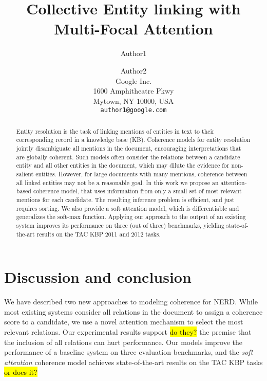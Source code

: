 \documentclass[11pt]{article}
\title{Collective Entity linking with Multi-Focal Attention}
\author{Author1 \and Author2\\
	    Google Inc. \\
	    1600 Amphitheatre Pkwy\\
	    Mytown, NY 10000, USA\\
	    {\tt author1@google.com}}
\date{}
\begin{document}
\maketitle

\begin{abstract}
Entity resolution is the task of linking mentions of entities in text to their corresponding record in a knowledge base (KB). Coherence models for entity resolution jointly disambiguate all mentions in the document,  encouraging interpretations that are globally coherent. Such models often consider the relations between a candidate entity and all other entities in the document, which may dilute the evidence for non-salient entities. However, for large documents with many mentions, coherence between all linked entities may not be a reasonable goal. In this work we propose an attention-based coherence model, that uses information from only a small set of most relevant mentions for each candidate. The resulting inference problem is efficient, and just requires sorting. We also provide a soft attention model, which is differentiable and generalizes the soft-max function. Applying our approach to the output of an existing system improves its performance on three (out of three) benchmarks, yielding state-of-the-art results on the TAC KBP 2011 and 2012 tasks.
\end{abstract}










\section{Discussion and conclusion}
We have described two new approaches to modeling coherence for NERD. While most existing systems consider all relations in the document to assign a coherence score to a candidate, we use a novel attention mechanism to select the most relevant relations. Our experimental results support \hl{do they?} the premise that the inclusion of all relations can hurt performance. Our models improve the performance of a baseline system on three evaluation benchmarks, and the \emph{soft attention} coherence model achieves state-of-the-art results on the TAC KBP tasks \hl{or does it?}




\small


\normalsize 
\end{document}
